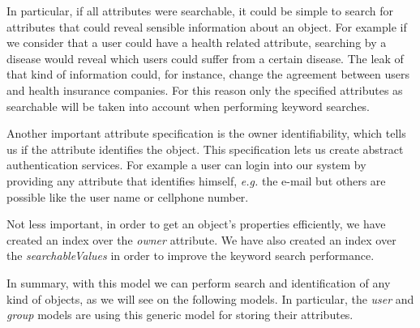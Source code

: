 In particular, if all attributes were searchable, it could be simple to search for attributes that could reveal sensible information about an object. For example if we consider that a user could have a health related attribute, searching by a disease would reveal which users could suffer from a certain disease. The leak of that kind of information could, for instance, change the agreement between users and health insurance companies. For this reason only the specified attributes as searchable will be taken into account when performing keyword searches.

Another important attribute specification is the owner identifiability, which tells us if the attribute identifies the object. This specification lets us create abstract authentication services. For example a user can login into our system by providing any attribute that identifies himself, \emph{e.g.} the e-mail but others are possible like the user name or cellphone number. 

Not less important, in order to get an object's properties efficiently, we have created an index over the \emph{owner} attribute. We have also created an index over the \emph{searchableValues} in order to improve the keyword search performance.

In summary, with this model we can perform search and identification of any kind of objects, as we will see on the following models. In particular, the \emph{user} and \emph{group} models are using this generic model for storing their attributes. 



